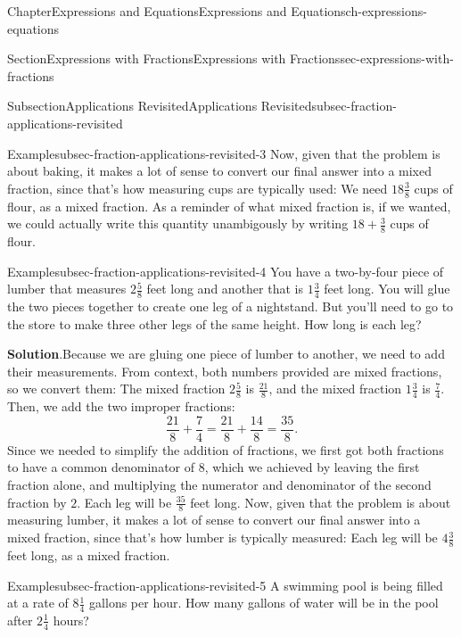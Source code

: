 \documentclass[twoside,11pt,]{book}
\newcommand{\blocktitlefont}{\relax}
\numberwithin{equation}{chapter}
\begin{document}
\begin{chapterptx}{Chapter}{Expressions and Equations}{}{Expressions and Equations}{}{}{ch-expressions-equations}
\begin{sectionptx}{Section}{Expressions with Fractions}{}{Expressions with Fractions}{}{}{sec-expressions-with-fractions}
\begin{subsectionptx}{Subsection}{Applications Revisited}{}{Applications Revisited}{}{}{subsec-fraction-applications-revisited}
\begin{example}{Example}{}{subsec-fraction-applications-revisited-3}
Now, given that the problem is about baking, it makes a lot of sense to convert our final answer into a mixed fraction, since that's how measuring cups are typically used: We need \(18\frac{3}{8}\) cups of flour, as a mixed fraction. As a reminder of what  mixed fraction is, if we wanted, we could actually write this quantity unambigously by writing \(18+ \frac38\) cups of flour.%
\end{example}
\begin{example}{Example}{}{subsec-fraction-applications-revisited-4}%
You have a two-by-four piece of lumber that measures \(2\frac{5}{8}\) feet long and another that is \(1\frac{3}{4}\) feet long. You will glue the two pieces together to create one leg of a nightstand. But you'll need to go to the store to make three other legs of the same height. How long is each leg?%
\par\smallskip%
\noindent\textbf{\blocktitlefont Solution}.\hypertarget{subsec-fraction-applications-revisited-4-2}{}\quad{}Because we are gluing one piece of lumber to another, we need to add their measurements. From context, both numbers provided are mixed fractions, so we convert them: The mixed fraction \(2\frac{5}{8}\) is \(\frac{21}{8}\), and the mixed fraction \(1\frac{3}{4}\) is \(\frac{7}{4}\). Then, we add the two improper fractions:%
\begin{equation*}
\frac{21}{8} + \frac{7}{4} = \frac{21}{8} + \frac{14}{8} = \frac{35}{8}.
\end{equation*}
Since we needed to simplify the addition of fractions, we first got both fractions to have a common denominator of \(8\), which we achieved by leaving the first fraction alone, and multiplying the numerator and denominator of the second fraction by \(2\). Each leg will be \(\frac{35}{8}\) feet long. Now, given that the problem is about measuring lumber, it makes a lot of sense to convert our final answer into a mixed fraction, since that's how lumber is typically measured: Each leg will be \(4\frac{3}{8}\) feet long, as a mixed fraction.%
\end{example}
\begin{example}{Example}{}{subsec-fraction-applications-revisited-5}%
A swimming pool is being filled at a rate of \(8\frac{1}{4}\) gallons per hour. How many gallons of water will be in the pool after \(2\frac{1}{4}\) hours?%
\par\smallskip%

\end{example}
\end{subsectionptx}
\end{sectionptx}
\end{chapterptx}
\end{document}
